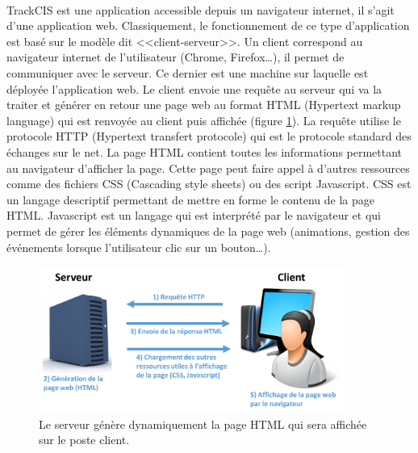 			\paragraph{}%
			TrackCIS est une application accessible depuis un navigateur internet, il
			s'agit d'une application web. Classiquement, le fonctionnement de ce type
			d'application est basé sur le modèle dit <<client-serveur>>. Un client
			correspond au navigateur internet de l'utilisateur (Chrome, Firefox\ldots),
			il permet de communiquer avec le serveur. Ce dernier est une machine sur
			laquelle est déployée l'application web. Le client envoie une requête au
			serveur qui va la traiter et générer en retour une page web au format HTML
			(Hypertext markup language) qui est renvoyée au client puis affichée
			(figure \ref{client_serveur}). La requête utilise le protocole HTTP
			(Hypertext transfert protocole) qui est le protocole standard des échanges
			sur le net. La page HTML contient toutes les informations permettant au
			navigateur d'afficher la page. Cette page peut faire appel à d'autres
			ressources comme des fichiers CSS (Cascading style sheets) ou des script
			Javascript. CSS est un langage descriptif permettant de mettre en forme le
			contenu de la page HTML.
			Javascript est un langage qui est interprété par le navigateur et qui
			permet de gérer les éléments dynamiques de la page web (animations, gestion
			des événements lorsque l'utilisateur clic sur un bouton\ldots).
			\begin{figure}[H]
				\centering
				\includegraphics[width=10cm]{../img/part3/client_serveur.png}
				\caption{\label{client_serveur} Le serveur génère dynamiquement la page
				HTML qui sera affichée sur le poste client.}
			\end{figure}
			
